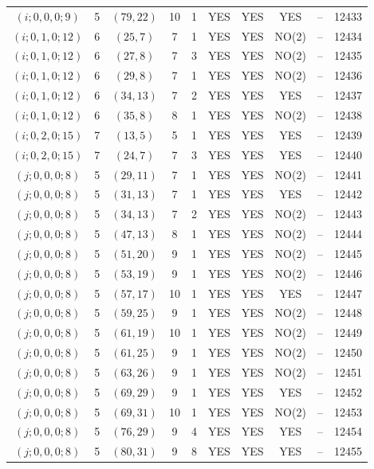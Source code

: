 \begin{longtable}{|c|c|c|c|c|c|c|c|c|c|}
$(i; 0, 0, 0; 9)$ & 5 & $(79, 22)$ & 10 & 1 & YES & YES & YES & -- & 12433\\
$(i; 0, 1, 0; 12)$ & 6 & $(25, 7)$ & 7 & 1 & YES & YES & NO(2) & -- & 12434\\
$(i; 0, 1, 0; 12)$ & 6 & $(27, 8)$ & 7 & 3 & YES & YES & NO(2) & -- & 12435\\
$(i; 0, 1, 0; 12)$ & 6 & $(29, 8)$ & 7 & 1 & YES & YES & NO(2) & -- & 12436\\
$(i; 0, 1, 0; 12)$ & 6 & $(34, 13)$ & 7 & 2 & YES & YES & YES & -- & 12437\\
$(i; 0, 1, 0; 12)$ & 6 & $(35, 8)$ & 8 & 1 & YES & YES & NO(2) & -- & 12438\\
$(i; 0, 2, 0; 15)$ & 7 & $(13, 5)$ & 5 & 1 & YES & YES & YES & -- & 12439\\
$(i; 0, 2, 0; 15)$ & 7 & $(24, 7)$ & 7 & 3 & YES & YES & YES & -- & 12440\\
$(j; 0, 0, 0; 8)$ & 5 & $(29, 11)$ & 7 & 1 & YES & YES & NO(2) & -- & 12441\\
$(j; 0, 0, 0; 8)$ & 5 & $(31, 13)$ & 7 & 1 & YES & YES & YES & -- & 12442\\
$(j; 0, 0, 0; 8)$ & 5 & $(34, 13)$ & 7 & 2 & YES & YES & NO(2) & -- & 12443\\
$(j; 0, 0, 0; 8)$ & 5 & $(47, 13)$ & 8 & 1 & YES & YES & NO(2) & -- & 12444\\
$(j; 0, 0, 0; 8)$ & 5 & $(51, 20)$ & 9 & 1 & YES & YES & NO(2) & -- & 12445\\
$(j; 0, 0, 0; 8)$ & 5 & $(53, 19)$ & 9 & 1 & YES & YES & NO(2) & -- & 12446\\
$(j; 0, 0, 0; 8)$ & 5 & $(57, 17)$ & 10 & 1 & YES & YES & YES & -- & 12447\\
$(j; 0, 0, 0; 8)$ & 5 & $(59, 25)$ & 9 & 1 & YES & YES & NO(2) & -- & 12448\\
$(j; 0, 0, 0; 8)$ & 5 & $(61, 19)$ & 10 & 1 & YES & YES & NO(2) & -- & 12449\\
$(j; 0, 0, 0; 8)$ & 5 & $(61, 25)$ & 9 & 1 & YES & YES & NO(2) & -- & 12450\\
$(j; 0, 0, 0; 8)$ & 5 & $(63, 26)$ & 9 & 1 & YES & YES & NO(2) & -- & 12451\\
$(j; 0, 0, 0; 8)$ & 5 & $(69, 29)$ & 9 & 1 & YES & YES & YES & -- & 12452\\
$(j; 0, 0, 0; 8)$ & 5 & $(69, 31)$ & 10 & 1 & YES & YES & NO(2) & -- & 12453\\
$(j; 0, 0, 0; 8)$ & 5 & $(76, 29)$ & 9 & 4 & YES & YES & YES & -- & 12454\\
$(j; 0, 0, 0; 8)$ & 5 & $(80, 31)$ & 9 & 8 & YES & YES & YES & -- & 12455\\

\end{longtable}
